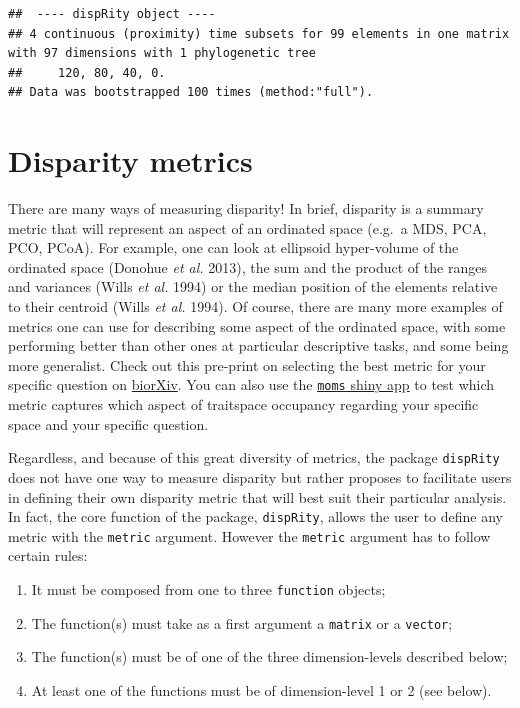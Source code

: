 \documentclass[]{book}
\providecommand{\tightlist}{%
  \setlength{\itemsep}{0pt}\setlength{\parskip}{0pt}}
\begin{document}
\begin{verbatim}
##  ---- dispRity object ---- 
## 4 continuous (proximity) time subsets for 99 elements in one matrix with 97 dimensions with 1 phylogenetic tree
##     120, 80, 40, 0.
## Data was bootstrapped 100 times (method:"full").
\end{verbatim}

\hypertarget{disparity-metrics}{%
\section{Disparity metrics}\label{disparity-metrics}}

There are many ways of measuring disparity!
In brief, disparity is a summary metric that will represent an aspect of an ordinated space (e.g.~a MDS, PCA, PCO, PCoA).
For example, one can look at ellipsoid hyper-volume of the ordinated space (Donohue \emph{et al.} 2013), the sum and the product of the ranges and variances (Wills \emph{et al.} 1994) or the median position of the elements relative to their centroid (Wills \emph{et al.} 1994).
Of course, there are many more examples of metrics one can use for describing some aspect of the ordinated space, with some performing better than other ones at particular descriptive tasks, and some being more generalist.
Check out this pre-print on selecting the best metric for your specific question on \href{https://www.biorxiv.org/content/10.1101/801571v1}{biorXiv}.
You can also use the \href{https://tguillerme.shinyapps.io/moms/}{\texttt{moms} shiny app} to test which metric captures which aspect of traitspace occupancy regarding your specific space and your specific question.

Regardless, and because of this great diversity of metrics, the package \texttt{dispRity} does not have one way to measure disparity but rather proposes to facilitate users in defining their own disparity metric that will best suit their particular analysis.
In fact, the core function of the package, \texttt{dispRity}, allows the user to define any metric with the \texttt{metric} argument.
However the \texttt{metric} argument has to follow certain rules:

\begin{enumerate}
\def\labelenumi{\arabic{enumi}.}
\tightlist
\item
  It must be composed from one to three \texttt{function} objects;
\item
  The function(s) must take as a first argument a \texttt{matrix} or a \texttt{vector};
\item
  The function(s) must be of one of the three dimension-levels described below;
\item
  At least one of the functions must be of dimension-level 1 or 2 (see below).
\end{enumerate}
\end{document}
